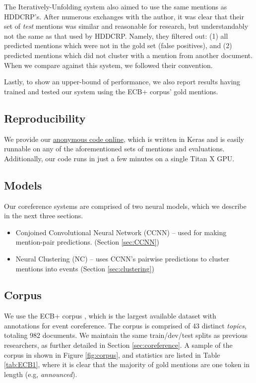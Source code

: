 \documentclass[11pt,a4paper]{article}
\begin{document}
The Iteratively-Unfolding system also aimed to use the same mentions as HDDCRP's.  After numerous exchanges with the author, it was clear that their set of \textit{test} mentions was similar and reasonable for research, but understandably not the same as that used by HDDCRP.  Namely, they filtered out: (1) all predicted mentions which were not in the gold set (false positives), and (2) predicted mentions which did not cluster with a mention from another document.  When we compare against this system, we followed their convention.

Lastly, to show an upper-bound of performance, we also report results having trained and tested our system using the ECB+ corpus' gold mentions.

\subsection{Reproducibility}
We provide our \href{https://drive.google.com/open?id=1iYT9kavm-r7t3YG9KRRQcQ7jtGL_KhnC}{anonymous code online}, which is written in Keras \cite{chollet2015} and is easily runnable on any of the aforementioned sets of mentions and evaluations.  Additionally, our code runs in just a few minutes on a single Titan X GPU.

\subsection{Models}
Our coreference systems are comprised of two neural models, which we describe in the next three sections.
\begin{itemize}
  \item Conjoined Convolutional Neural Network (CCNN) -- used for making mention-pair predictions.  (Section \ref{sec:CCNN})
  \item Neural Clustering (NC) -- uses CCNN's pairwise predictions to cluster mentions into events (Section \ref{sec:clustering})
\end{itemize}

\subsection{Corpus}
\label{sec:corpus}
We use the ECB+ corpus \cite{ECB+}, which is the largest available dataset with annotations for event coreference.  The corpus is comprised of 43 distinct \textit{topics}, totaling 982 documents.  We maintain the same train/dev/test splits as previous researchers, as further detailed in Section \ref{sec:coreference}.  A sample of the corpus in shown in Figure \ref{fig:corpus}, and statistics are listed in Table \ref{tab:ECB1}, where it is clear that the majority of gold mentions are one token in length (e.g, \textit{announced}).
\end{document}
